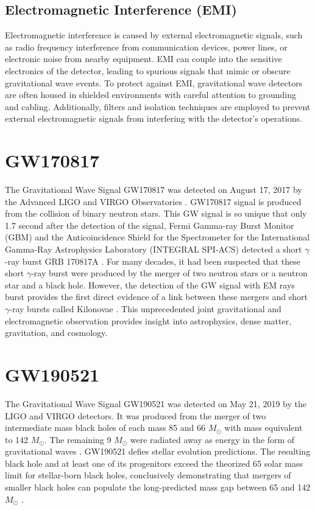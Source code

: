 \subsection{Electromagnetic Interference (EMI)} Electromagnetic interference is caused by external electromagnetic signals, such as radio frequency interference from communication devices, power lines, or electronic noise from nearby equipment. EMI can couple into the sensitive electronics of the detector, leading to spurious signals that mimic or obscure gravitational wave events. To protect against EMI, gravitational wave detectors are often housed in shielded environments with careful attention to grounding and cabling. Additionally, filters and isolation techniques are employed to prevent external electromagnetic signals from interfering with the detector's operations.

\section{GW170817}
The Gravitational Wave Signal GW170817 was detected on August 17, 2017 by the Advanced LIGO and VIRGO Observatories \citep{2017ApJ...848L..12A}. GW170817 signal is produced from the collision of binary neutron stars. This GW signal is so unique that only 1.7 second after the detection of the signal, Fermi Gamma-ray Burst Monitor (GBM) and the Anticoincidence Shield for the Spectrometer for the International Gamma-Ray Astrophysics Laboratory (INTEGRAL SPI-ACS) detected a short $\gamma$-ray burst GRB 170817A \citep{Savchenko_2017}. For many decades, it had been suspected that these short $\gamma$-ray burst were produced by the merger of two neutron stars or a neutron star and a black hole. However, the detection of the GW signal with EM rays burst provides the first direct evidence of a link between these mergers and short $\gamma$-ray bursts called Kilonovae \citep{2017ApJ...848L..12A}. This unprecedented joint gravitational and electromagnetic observation provides insight into astrophysics, dense matter, gravitation, and cosmology.
\section{GW190521}
The Gravitational Wave Signal GW190521 was detected on May 21, 2019 by the LIGO and VIRGO detectors. It was produced from the merger of two intermediate mass black holes of each mass 85 and 66 $M_\odot$ with mass equivalent to 142 $M_\odot$. The remaining 9 $M_\odot$ were radiated away as energy in the form of gravitational waves \citep{abbott2020properties}. GW190521 defies stellar evolution predictions. The resulting black hole and at least one of its progenitors exceed the theorized 65 solar mass limit for stellar-born black holes, conclusively demonstrating that mergers of smaller black holes can populate the long-predicted mass gap between 65 and 142 $M_\odot$ \citep{abbott2020properties}
.
